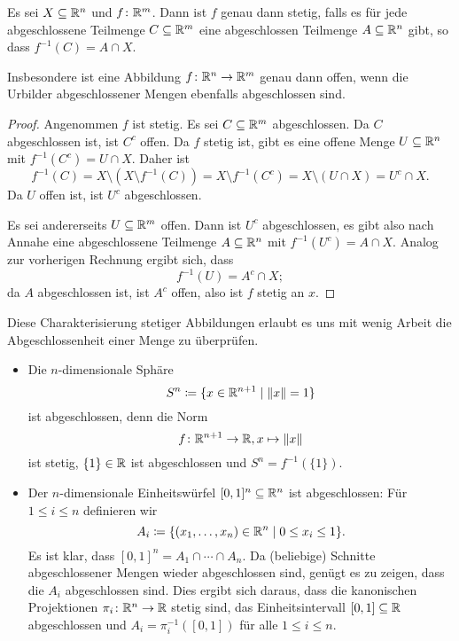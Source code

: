 \documentclass[a4paper,10pt]{article}
\begin{document}
\begin{lem}
 Es sei $X \subseteq \mathbb{R}^n$ und $f \colon \mathbb{R}^m$. Dann ist $f$ genau dann stetig, falls es für jede abgeschlossene Teilmenge $C \subseteq \mathbb{R}^m$ eine abgeschlossen Teilmenge $A \subseteq \mathbb{R}^n$ gibt, so dass $f^{-1}(C) = A \cap X$.
 
 Insbesondere ist eine Abbildung $f \colon \mathbb{R}^n \to \mathbb{R}^m$ genau dann offen, wenn die Urbilder abgeschlossener Mengen ebenfalls abgeschlossen sind.
\end{lem}
\begin{proof}
 Angenommen $f$ ist stetig. Es sei $C \subseteq \mathbb{R}^m$ abgeschlossen. Da $C$ abgeschlossen ist, ist $C^c$ offen. Da $f$ stetig ist, gibt es eine offene Menge $U \subseteq \mathbb{R}^n$ mit $f^{-1}(C^c) = U \cap X$. Daher ist
 \[
  f^{-1}(C)
  = X \setminus (X \setminus f^{-1}(C))
  = X \setminus f^{-1}(C^c)
  = X \setminus (U \cap X)
  = U^c \cap X.
 \]
 Da $U$ offen ist, ist $U^c$ abgeschlossen.
 
 Es sei andererseits $U \subseteq \mathbb{R}^m$ offen. Dann ist $U^c$ abgeschlossen, es gibt also nach Annahe eine abgeschlossene Teilmenge $A \subseteq \mathbb{R}^n$ mit $f^{-1}(U^c) = A \cap X$. Analog zur vorherigen Rechnung ergibt sich, dass
 \[
  f^{-1}(U) = A^c \cap X;
 \]
 da $A$ abgeschlossen ist, ist $A^c$ offen, also ist $f$ stetig an $x$.
\end{proof}


Diese Charakterisierung stetiger Abbildungen erlaubt es uns mit wenig Arbeit die Abgeschlossenheit einer Menge zu überprüfen.


\begin{bsp}
 \begin{itemize}
  \item
   Die $n$-dimensionale Sphäre
   \[
    S^n \coloneqq \{x \in \mathbb{R}^{n+1} \mid \|x\| = 1\}
   \]
   ist abgeschlossen, denn die Norm
   \[
    f \colon \mathbb{R}^{n+1} \to \mathbb{R}, x \mapsto \|x\|
   \]
   ist stetig, $\{1\} \in \mathbb{R}$ ist abgeschlossen und $S^n = f^{-1}(\{1\})$.
  \item
   Der $n$-dimensionale Einheitswürfel $[0,1]^n \subseteq \mathbb{R}^n$ ist abgeschlossen: Für $1 \leq i \leq n$ definieren wir
   \[
    A_i \coloneqq \{(x_1, \dotsc, x_n) \in \mathbb{R}^n \mid 0 \leq x_i \leq 1\}.
   \]
   Es ist klar, dass $[0,1]^n = A_1 \cap \dotsb \cap A_n$. Da (beliebige) Schnitte abgeschlossener Mengen wieder abgeschlossen sind, genügt es zu zeigen, dass die $A_i$ abgeschlossen sind. Dies ergibt sich daraus, dass die kanonischen Projektionen $\pi_i \colon \mathbb{R}^n \to \mathbb{R}$ stetig sind, das Einheitsintervall $[0,1] \subseteq \mathbb{R}$ abgeschlossen und $A_i = \pi_i^{-1}([0,1])$ für alle $1 \leq i \leq n$.
 \end{itemize}
\end{bsp}
\end{document}
